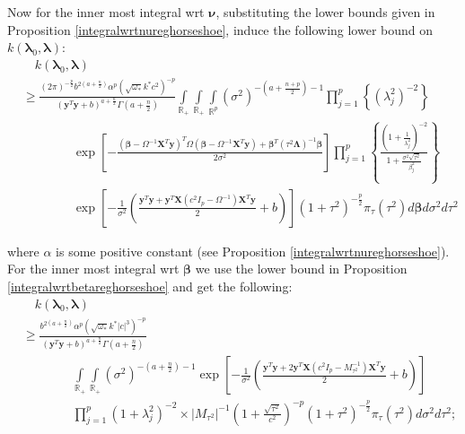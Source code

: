 \documentclass[noinfoline,11pt]{imsart}
\numberwithin{equation}{section}
\theoremstyle{plain}
\newcommand{\y}{\mathbf{y}}
\newcommand{\X}{\mathbf{X}}
\newcommand{\bb}{\boldsymbol{\beta}}
\newcommand{\bl}{\boldsymbol{\lambda}}
\newcommand{\Bl}{\boldsymbol{\Lambda}}
\begin{document}
\noindent
Now for the inner most integral wrt $\boldsymbol \nu$, substituting the lower bounds given in Proposition \ref{integralwrtnureghorseshoe}, induce the following lower bound on $k\left(\bl_0,\bl\right)$:
\begin{align*}
& \quad k\left(\bl_0,\bl\right)\nonumber \\
& \geq \frac{\left(2\pi\right)^{-\frac{p}{2}}b^{2\left(a+\frac{n}{2}\right)}\alpha^p\left(\sqrt{\omega_*}k^*c^2\right)^{-p}}{\left(\y^T\y+b\right)^{a+\frac{n}{2}}\Gamma\left(a+\frac{n}{2}\right)}\int\limits_{\mathbb{R}_+}\int\limits_{\mathbb{R}_+}\int\limits_{\mathbb{R}^p}\left(\sigma^2\right)^{-\left(a+\frac{n+p}{2}\right)-1}\prod\limits_{j=1}^p\left\{\left(\lambda_j^2\right)^{-2}\right\}\nonumber \\ 
& \qquad \qquad \exp{\left[-\frac{\left(\bb-\Omega^{-1}\X^T\y\right)^T \Omega\left(\bb-\Omega^{-1}\X^T\y\right)+\bb^T\left(\tau^2\Bl\right)^{-1}\bb}{2\sigma^2}\right]}\prod\limits_{j=1}^p\left\{\frac{\left(1+\frac{1}{\lambda_j^2}\right)^{-2}}{1+\frac{\sigma^2\sqrt{\tau^2}}{\beta_j^2}}\right\}\nonumber \\
& \qquad \qquad \exp{\left[-\frac{1}{\sigma^2}\left(\frac{\y^T\y+\y^T\X\left(c^2I_p-\Omega^{-1}\right)\X^T\y}{2}+b\right)\right]}\left(1+\tau^2\right)^{-\frac{p}{2}}\pi_\tau\left(\tau^2\right)d\bb d\sigma^2 d\tau^2 
\end{align*}

\noindent
where $\alpha$ is some positive constant (see Proposition \ref{integralwrtnureghorseshoe}). For the inner most integral wrt $\bb$ we use the lower bound in Proposition \ref{integralwrtbetareghorseshoe} and get the following:
\begin{align*}
& \quad k\left(\bl_0,\bl\right)\nonumber \\
& \geq \frac{b^{2\left(a+\frac{n}{2}\right)}\alpha^p\left(\sqrt{\omega_*}k^*|c|^3\right)^{-p}}{\left(\y^T\y+b\right)^{a+\frac{n}{2}}\Gamma\left(a+\frac{n}{2}\right)}\nonumber \\
& \qquad \qquad \int\limits_{\mathbb{R}_+}\int\limits_{\mathbb{R}_+}\left(\sigma^2\right)^{-\left(a+\frac{n}{2}\right)-1}\exp{\left[-\frac{1}{\sigma^2}\left(\frac{\y^T\y+2\y^T\X\left(c^2I_p-M_{\tau^2}^{-1}\right)\X^T\y}{2}+b\right)\right]}\nonumber \\
& \qquad \qquad \prod\limits_{j=1}^p\left(1+\lambda_j^2\right)^{-2}\times \left|M_{\tau^2}\right|^{-1}\left(1+\frac{\sqrt{\tau^2}}{c^2}\right)^{-p}\left(1+\tau^2\right)^{-\frac{p}{2}}\pi_\tau\left(\tau^2\right)d\sigma^2d\tau^2; 
\end{align*}
\end{document}
